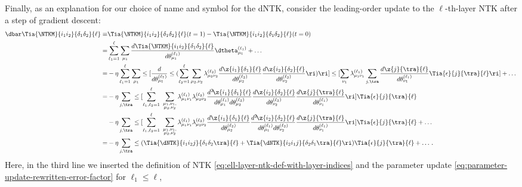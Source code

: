 Finally, as an explanation for our choice of name and symbol for the dNTK,  consider the leading-order update to the $\ell$-th-layer NTK after a step of gradient descent: 
\begin{align}
\dbar\Tia{\NTKM}{i_1i_2}{\delta_1\delta_2}{\ell}\equiv&\Tia{\NTKM}{i_1i_2}{\delta_1\delta_2}{\ell}(t=1)-\Tia{\NTKM}{i_1i_2}{\delta_1\delta_2}{\ell}(t=0)\, \label{eq:dNTK-naming}\\
=&\sum_{\ell_1=1}^\ell \sum_{\mu_1}\frac{d\Tia{\NTKM}{i_1i_2}{\delta_1\delta_2}{\ell}}{d\theta_{\mu_1}^{(\ell_1)}}\dtheta_{\mu_1}^{(\ell_1)}+\ldots\, \nonumber\\
=&-\eta \sum_{\ell_1=1}^\ell \sum_{\mu_1}\le[\frac{d}{d\theta^{(\ell_1)}_{\mu_1}}\le(\sum_{\ell_2=1}^\ell\sum_{\mu_2,\nu_2}\lambda_{\mu_2\nu_2}^{(\ell_2)}\frac{d\z{i_1}{\delta_1}{\ell}}{d\theta_{\mu_2}^{(\ell_2)}}\frac{d\z{i_2}{\delta_2}{\ell}}{d\theta^{(\ell_2)}_{\nu_2}}\ri)\ri]\le[\sum_{\nu_1}\lambda_{\mu_1\nu_1}^{(\ell_1)}\sum_{j,\tra}\frac{d\z{j}{\tra}{\ell}}{d\theta_{\nu_1}^{(\ell_1)}}\Tia{\epsilon}{j}{\tra}{\ell}\ri]+\ldots\, \nonumber\\
=&-\eta\sum_{j,\tra}\le[ \sum_{\ell_1, \ell_2=1}^\ell\,\, \sum_{\substack{\mu_1,\nu_1, \\ \mu_2,\nu_2} }\lambda_{\mu_1\nu_1}^{(\ell_1)}\lambda_{\mu_2\nu_2}^{(\ell_2)}\frac{d^2\!\z{i_1}{\delta_1}{\ell}}{d\theta^{(\ell_1)}_{\mu_1}d\theta_{\mu_2}^{(\ell_2)}}\frac{d\z{i_2}{\delta_2}{\ell}}{d\theta^{(\ell_2)}_{\nu_2}}\frac{d\z{j}{\tra}{\ell}}{d\theta^{(\ell_1)}_{\nu_1}}\ri]\Tia{\epsilon}{j}{\tra}{\ell}\, \nonumber\\
&-\eta\sum_{j,\tra}\le[ \sum_{\ell_1, \ell_2=1}^\ell\,\, \sum_{\substack{\mu_1,\nu_1, \\ \mu_2,\nu_2} } \lambda_{\mu_1\nu_1}^{(\ell_1)}\lambda_{\mu_2\nu_2}^{(\ell_2)}\frac{d\z{i_1}{\delta_1}{\ell}}{d\theta_{\mu_2}^{(\ell_2)}}\frac{d^2\!\z{i_2}{\delta_2}{\ell}}{d\theta_{\mu_1}^{(\ell_1)}d\theta_{\nu_2}^{(\ell_2)}}\frac{d\z{j}{\tra}{\ell}}{d\theta_{\nu_1}^{(\ell_1)}}\ri]\Tia{\epsilon}{j}{\tra}{\ell}+\ldots\, \nonumber\\
=&-\eta\sum_{j,\tra}\le(\Tia{\dNTK}{i_1 i_2j}{\delta_1\delta_2\tra}{\ell}+\Tia{\dNTK}{i_2i_1j}{\delta_2\delta_1\tra}{\ell}\ri)\Tia{\epsilon}{j}{\tra}{\ell}+\ldots\, .\nonumber
\end{align}
Here, in the third line we inserted the definition of NTK \eqref{eq:ell-layer-ntk-def-with-layer-indices} and the parameter update \eqref{eq:parameter-update-rewritten-error-factor} for $\ell_1\leq\ell$, 
